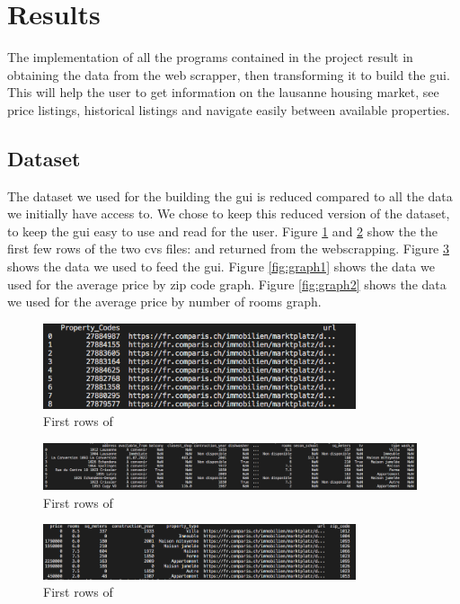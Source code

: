 \documentclass[main]{subfiles}
\begin{document}
\section{Results}
The implementation of all the programs contained in the project result in obtaining the data from the web scrapper,
then transforming it to build the \ac{gui}.
This will help the user to get information on the lausanne housing market, see price listings, historical listings and navigate easily between available properties.

\subsection{Dataset}
The dataset we used for the building the \ac{gui} is reduced compared to all the data we initially have access to. 
We chose to keep this reduced version of the dataset, to keep the \ac{gui} easy to use and read for the user. 
Figure \ref{fig:propcodes} and \ref{fig:propdetails} show the the first few rows of the two cvs files:  and  returned from the webscrapping.
Figure \ref{fig:dataxlsx} shows the data we used to feed the \ac{gui}.
Figure \ref{fig:graph1} shows the data we used for the average price by zip code graph.
Figure \ref{fig:graph2} shows the data we used for the average price by number of rooms graph.

\begin{figure}[htbp]
    \centerline{
        \includegraphics[width = 92mm]{prog_13.png}}
    \caption{First rows of }
    \label{fig:propcodes}
\end{figure}

\begin{figure}[htbp]
    \centerline{
        \includegraphics[width = 110mm]{prog_14.png}}
    \caption{First rows of }
    \label{fig:propdetails}
\end{figure}

\begin{figure}[htbp]
    \centerline{
        \includegraphics[width = 92mm]{prog_15.png}}
    \caption{First rows of }
    \label{fig:dataxlsx}
\end{figure}
\end{document}
